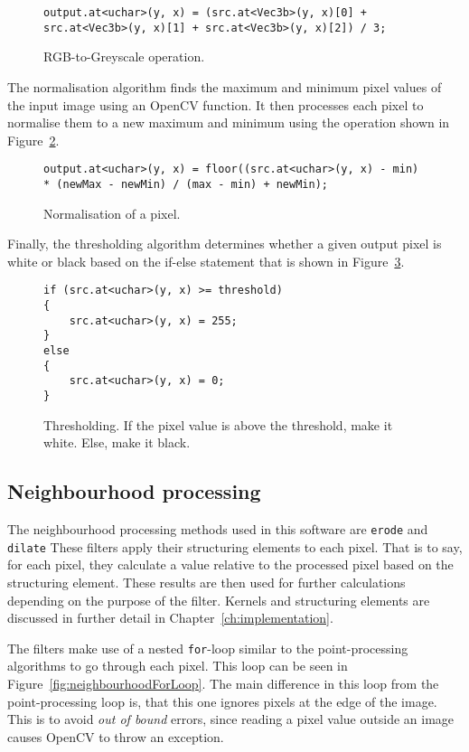 \begin{figure}[!h]
\begin{lstlisting}
output.at<uchar>(y, x) = (src.at<Vec3b>(y, x)[0] + src.at<Vec3b>(y, x)[1] + src.at<Vec3b>(y, x)[2]) / 3;
\end{lstlisting}
\caption{RGB-to-Greyscale operation.\label{fig:rgb2gray}}
\end{figure}

The normalisation algorithm finds the maximum and minimum pixel values of the input image using an OpenCV function. It then processes each pixel to normalise them to a new maximum and minimum using the operation shown in Figure~\ref{fig:normalize}.

\begin{figure}[!h]
\begin{lstlisting}
output.at<uchar>(y, x) = floor((src.at<uchar>(y, x) - min) * (newMax - newMin) / (max - min) + newMin);
\end{lstlisting}
\caption{Normalisation of a pixel. \label{fig:normalize}}
\end{figure} 

Finally, the thresholding algorithm determines whether a given output pixel is white or black based on the if-else statement that is shown in Figure~\ref{fig:threshold}.
\begin{figure}[!h]
\begin{lstlisting}
if (src.at<uchar>(y, x) >= threshold)
{
	src.at<uchar>(y, x) = 255;
}
else
{
	src.at<uchar>(y, x) = 0;
}
\end{lstlisting}
\caption{Thresholding. If the pixel value is above the threshold, make it white. Else, make it black.\label{fig:threshold}}
\end{figure}

\subsection{Neighbourhood processing}
The neighbourhood processing methods used in this software are \texttt{erode} and \texttt{dilate} These filters apply their structuring elements to each pixel. That is to say, for each pixel, they calculate a value relative to the processed pixel based on the structuring element. These results are then used for further calculations depending on the purpose of the filter. Kernels and structuring elements are discussed in further detail in Chapter~\ref{ch:implementation}.	

The filters make use of a nested \texttt{for}-loop similar to the point-processing algorithms to go through each pixel. This loop can be seen in Figure~\ref{fig:neighbourhoodForLoop}. The main difference in this loop from the point-processing loop is, that this one ignores pixels at the edge of the image. This is to avoid \textit{out of bound} errors, since reading a pixel value outside an image causes OpenCV to throw an exception.

